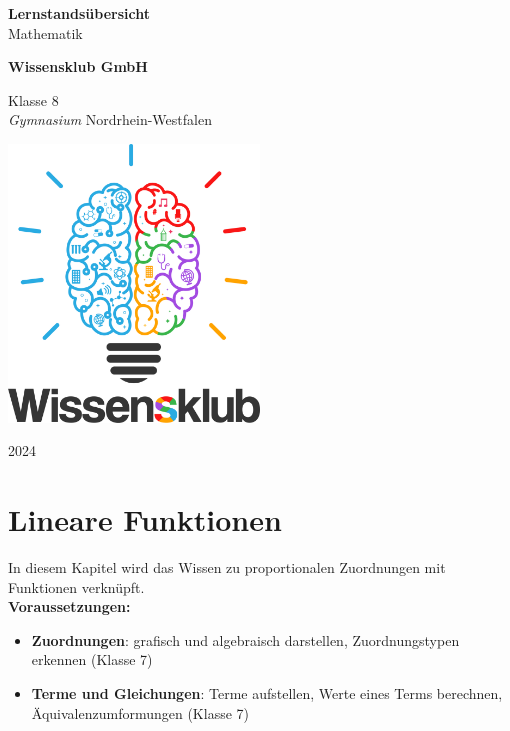 \documentclass{article}
\begin{document}
\begin{titlepage}
    \begin{center}
        \vspace*{1cm}
            
        \Huge
        \textbf{Lernstandsübersicht}\\            
        \vspace{0.5cm}
        \LARGE
        Mathematik
            
        \vspace{1.5cm}
            
        \textbf{Wissensklub GmbH}
            
        \vfill
            
        Klasse 8\\
        \textit{Gymnasium} Nordrhein-Westfalen
            
        \vspace{0.8cm}
            
        \includegraphics[width=0.5\textwidth]{Wissensklub-Logo.png}
            
        \Large
        2024          
    \end{center}
\end{titlepage}

\section{Lineare Funktionen}
In diesem Kapitel wird das Wissen zu proportionalen Zuordnungen mit Funktionen verknüpft.\\
\textbf{Voraussetzungen: }
\begin{itemize}
    \item \textbf{Zuordnungen}: grafisch und algebraisch darstellen, Zuordnungstypen erkennen (Klasse 7)
    \item \textbf{Terme und Gleichungen}: Terme aufstellen, Werte eines Terms berechnen, Äquivalenzumformungen (Klasse 7)
\end{itemize}
\end{document}
